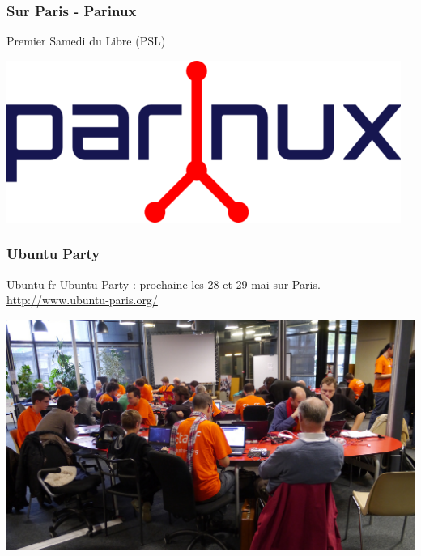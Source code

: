 \documentclass{beamer}
\begin{document}
\begin{frame}
\frametitle{Sur Paris - Parinux}

\begin{block}{Premier Samedi du Libre (PSL)}
\end{block}
\begin{center}
\includegraphics[scale=0.5] {./images/parinux.png}
\end{center} 
\end{frame}
\begin{frame}
\frametitle{Ubuntu Party}
\begin{block}{Ubuntu-fr}
Ubuntu Party : prochaine les 28 et 29 mai sur Paris.\\
\url{http://www.ubuntu-paris.org/}
\end{block}
\begin{center}
\includegraphics[scale=0.3] {./images/ubuntu-paris.jpg}
\end{center} 
\end{frame}
\end{document}
